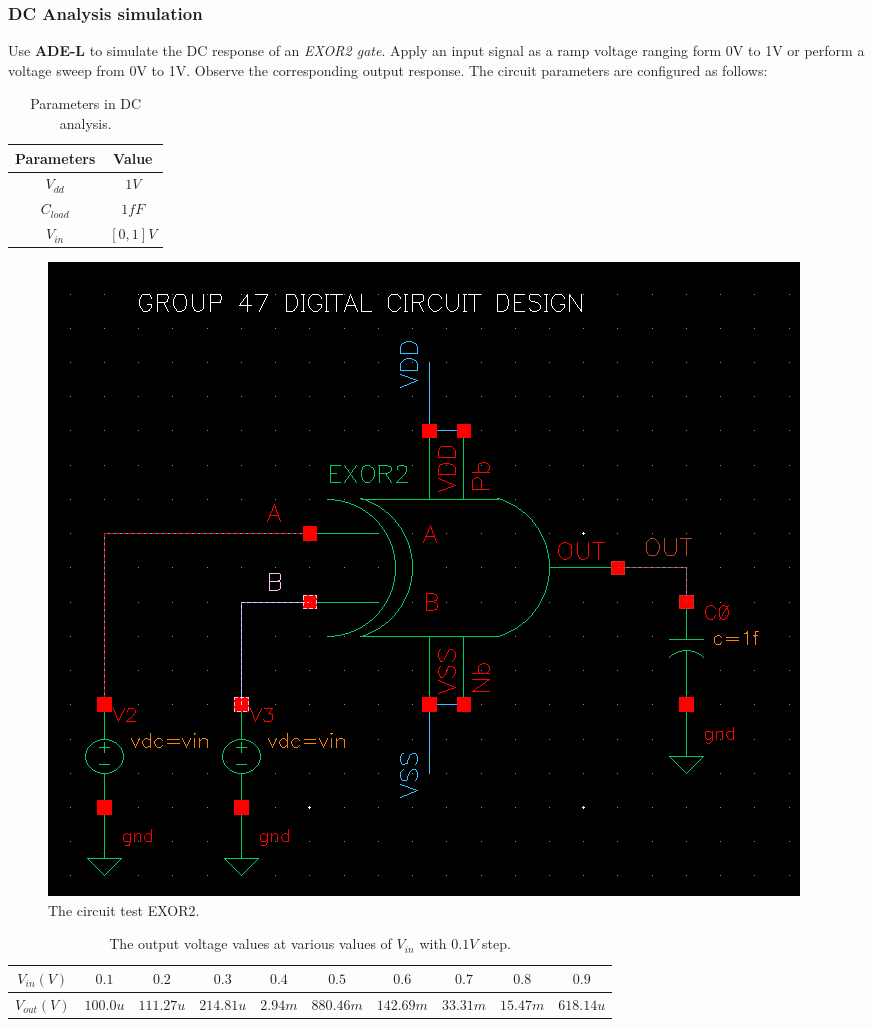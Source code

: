 \subsubsection{DC Analysis simulation}

Use \textbf{ADE-L} to simulate the DC response of an \textit{EXOR2 gate}. Apply an input signal as a ramp voltage ranging form 0V to 1V or perform a voltage sweep from 0V to 1V. Observe the corresponding output response. The circuit parameters are configured as follows:

\begin{table}[H]
	\centering
	\begin{tabular}{|c|c|}
		\hline
		Parameters & Value \\
		\hline
		$V_{dd}$ & $1V$ \\
		\hline
		$C_{load}$ & $1fF$\\
		\hline
		$V_{in}$ & $[0, 1] V$\\
		\hline
	\end{tabular}
	\caption{Parameters in DC analysis.}
\end{table}

\begin{figure}[H]
	\centering
	\includegraphics[width=.6\linewidth]{section/EX1/EXOR/EX1_EXOR2_DCanalysis_schematic.png}
	\caption{The circuit test EXOR2.}
\end{figure}


\begin{table}[H]
	\centering
	\begin{tabular}{|c|c|c|c|c|c|c|c|c|c|}
		\hline
		$V_{in}(V)$ & $0.1$ & $0.2$ & $0.3$ & $0.4$ & $0.5$ & $0.6$ & $0.7$ & $0.8$ & $0.9$ \\
		\hline
		$V_{out}(V)$ & $100.0u$ & $111.27u$ & $214.81u$ & $2.94m$ & $880.46m$ & $142.69m$ & $33.31m$ & $15.47m$ & $618.14u$ \\
		\hline
	\end{tabular}
	\caption{The output voltage values at various values of $V_{in}$ with $0.1V$ step.}
\end{table}

